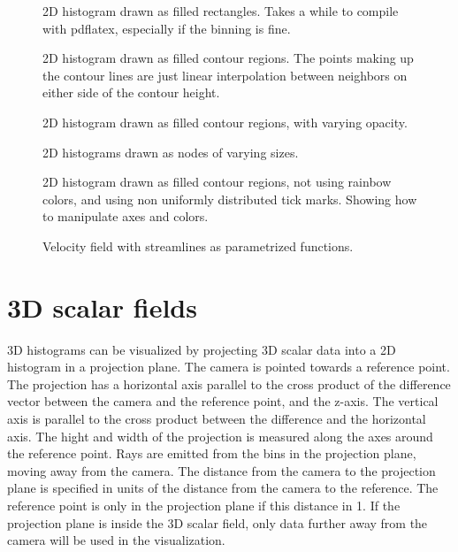 \documentclass{article}
\begin{document}
\begin{figure}[H]
\centering

\captionsetup{singlelinecheck=off}
\caption[asdf]{2D histogram drawn as filled rectangles. Takes a while to compile with pdflatex, 
especially if the binning is fine.}
\end{figure}
\begin{figure}[H]
\centering

\captionsetup{singlelinecheck=off}
\caption[asdf]{2D histogram drawn as filled contour regions. The points making up the contour lines 
are just linear interpolation between neighbors on either side of the contour height.}
\end{figure}
\begin{figure}[H]
\centering

\captionsetup{singlelinecheck=off}
\caption[asdf]{2D histogram drawn as filled contour regions, with varying opacity.}
\end{figure}
\begin{figure}[H]
\centering

\captionsetup{singlelinecheck=off}
\caption[asdf]{2D histograms drawn as nodes of varying sizes.}
\end{figure}
\begin{figure}[H]
\centering

\captionsetup{singlelinecheck=off}
\caption[asdf]{2D histogram drawn as filled contour regions, not using rainbow colors, and using
non uniformly distributed tick marks. Showing how to manipulate axes and colors.}
\end{figure}
\begin{figure}[H]
\centering

\captionsetup{singlelinecheck=off}
\caption[asdf]{Velocity field with streamlines as parametrized functions.}
\end{figure}
\section{3D scalar fields}


3D histograms can be visualized by projecting 3D scalar data into a 2D
histogram in a projection plane. The camera is pointed towards a reference point. The
projection has a horizontal axis parallel to the cross product of the difference vector
between the camera and the reference point, and the z-axis. The vertical axis is parallel to
the cross product between the difference and the horizontal axis. The hight and width of the
projection is measured along the axes around the reference point. Rays are emitted from the
bins in the projection plane, moving away from the camera. The distance from the camera to
the projection plane is specified in units of the distance from the camera to the
reference. The reference point is only in the projection plane if this distance in 1. If the
projection plane is inside the 3D scalar field, only data further away from the camera will
be used in the visualization.
\end{document}
